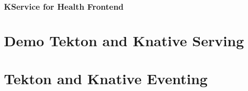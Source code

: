 \documentclass[aspectratio=169,11pt,hyperref={colorlinks=true}]{beamer}
\begin{document}
\begin{lblackrwhiteframe}
\begin{lblackrwhiteframe}
\begin{blackframe}

\begin{2columnsframe}
  {
  
  }
  {
  
  }
  \frametitle{KService for Health Frontend}
\end{2columnsframe}

\section{Demo Tekton and Knative Serving}

\section{Tekton and Knative Eventing}


\end{blackframe}
\end{lblackrwhiteframe}
\end{lblackrwhiteframe}
\end{document}
